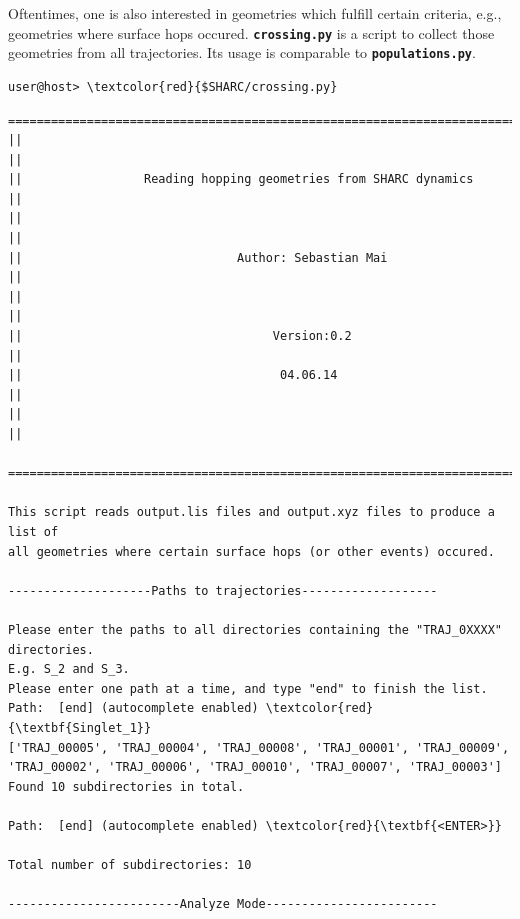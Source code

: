 \documentclass[a4paper,11pt,DIV=15,openany]{scrbook}
\newcommand{\ttt}[1]{\textbf{\texttt{#1}}}
\begin{document}
Oftentimes, one is also interested in geometries which fulfill certain criteria, e.g., geometries where surface hops occured. \ttt{crossing.py} is a script to collect those geometries from all trajectories. Its usage is comparable to \ttt{populations.py}.
\begin{Verbatim}[commandchars=\\\{\}]
user@host> \textcolor{red}{$SHARC/crossing.py}
\end{Verbatim}

\begin{oframed}
\footnotesize\begin{Verbatim}[commandchars=\\\{\}]
  ================================================================================
||                                                                                ||
||                 Reading hopping geometries from SHARC dynamics                 ||
||                                                                                ||
||                              Author: Sebastian Mai                             ||
||                                                                                ||
||                                   Version:0.2                                  ||
||                                    04.06.14                                    ||
||                                                                                ||
  ================================================================================

This script reads output.lis files and output.xyz files to produce a list of 
all geometries where certain surface hops (or other events) occured.
  
--------------------Paths to trajectories-------------------

Please enter the paths to all directories containing the "TRAJ_0XXXX" directories.
E.g. S_2 and S_3. 
Please enter one path at a time, and type "end" to finish the list.
Path:  [end] (autocomplete enabled) \textcolor{red}{\textbf{Singlet_1}}
['TRAJ_00005', 'TRAJ_00004', 'TRAJ_00008', 'TRAJ_00001', 'TRAJ_00009', 
'TRAJ_00002', 'TRAJ_00006', 'TRAJ_00010', 'TRAJ_00007', 'TRAJ_00003']
Found 10 subdirectories in total.

Path:  [end] (autocomplete enabled) \textcolor{red}{\textbf{<ENTER>}}

Total number of subdirectories: 10

------------------------Analyze Mode------------------------


\end{Verbatim}
\end{oframed}
\end{document}
